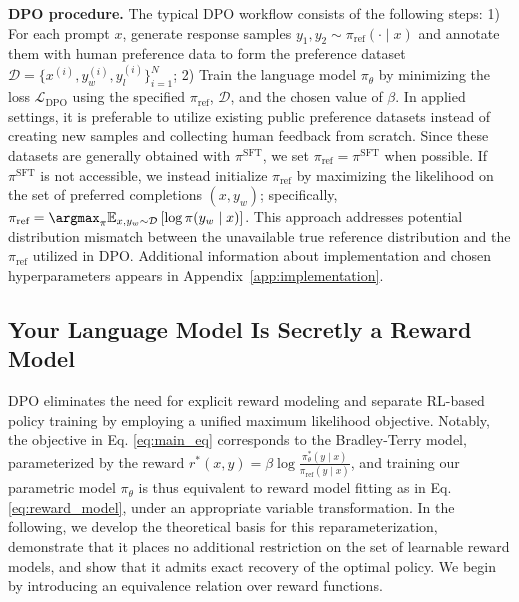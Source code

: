 \textbf{DPO procedure.} The typical DPO workflow consists of the following steps: 1) For each prompt $x$, generate response samples $y_1, y_2 \sim \pi_\text{ref}(\cdot \mid x)$ and annotate them with human preference data to form the preference dataset $\mathcal{D} = \{x^{(i)}, y_w^{(i)}, y_l^{(i)}\}_{i=1}^N$; 2) Train the language model $\pi_\theta$ by minimizing the loss $\mathcal{L}_\text{DPO}$ using the specified $\pi_\text{ref}$, $\mathcal{D}$, and the chosen value of $\beta$. 
In applied settings, it is preferable to utilize existing public preference datasets instead of creating new samples and collecting human feedback from scratch. Since these datasets are generally obtained with $\pi^\text{SFT}$, we set $\pi_\text{ref} = \pi^\text{SFT}$ when possible. If $\pi^\text{SFT}$ is not accessible, we instead initialize $\pi_\text{ref}$ by maximizing the likelihood on the set of preferred completions ${(x, y_w)}$; specifically, ${\pi_\text{ref} = \argmax_{\pi}\mathbb{E}_{x, y_w \sim \mathcal{D}}\left[\log \pi(y_w \mid x)\right]}$. This approach addresses potential distribution mismatch between the unavailable true reference distribution and the $\pi_\text{ref}$ utilized in DPO. Additional information about implementation and chosen hyperparameters appears in Appendix~\ref{app:implementation}.

\label{sec:theory}

\subsection{Your Language Model Is Secretly a Reward Model} DPO eliminates the need for explicit reward modeling and separate RL-based policy training by employing a unified maximum likelihood objective. Notably, the objective in Eq. \ref{eq:main_eq} corresponds to the Bradley-Terry model, parameterized by the reward $r^*(x, y) = \beta \log\frac{\pi^*_\theta(y \mid x)}{\pi_\text{ref}(y \mid x)}$, and training our parametric model $\pi_{\theta}$ is thus equivalent to reward model fitting as in Eq. \ref{eq:reward_model}, under an appropriate variable transformation. In the following, we develop the theoretical basis for this reparameterization, demonstrate that it places no additional restriction on the set of learnable reward models, and show that it admits exact recovery of the optimal policy. We begin by introducing an equivalence relation over reward functions.

